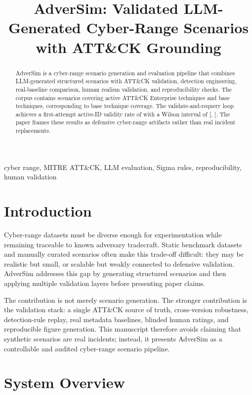 \documentclass[conference]{IEEEtran}
\title{AdverSim: Validated LLM-Generated Cyber-Range Scenarios with ATT\&CK Grounding}
\author{
\IEEEauthorblockN{Anonymous Authors}
\IEEEauthorblockA{Manuscript draft scaffold for macro-wired presentation}
}
\begin{document}
\maketitle

\begin{abstract}
AdverSim is a cyber-range scenario generation and evaluation pipeline that
combines LLM-generated structured scenarios with ATT\&CK validation, detection
engineering, real-baseline comparison, human realism validation, and
reproducibility checks. The corpus contains \ScenarioCount{} scenarios covering
\UniqueActiveV{} active ATT\&CK Enterprise techniques and
\UniqueBaseTechniques{} base techniques, corresponding to \BaseCoverage{} base
technique coverage. The validate-and-requery loop achieves a first-attempt
active-ID validity rate of \FirstAttemptRate{} with a Wilson interval of
[\FirstAttemptCIlo{}, \FirstAttemptCIhi{}]. The paper frames these results as
defensive cyber-range artifacts rather than real incident replacements.
\end{abstract}

\begin{IEEEkeywords}
cyber range, MITRE ATT\&CK, LLM evaluation, Sigma rules, reproducibility,
human validation
\end{IEEEkeywords}

\section{Introduction}

Cyber-range datasets must be diverse enough for experimentation while remaining
traceable to known adversary tradecraft. Static benchmark datasets and manually
curated scenarios often make this trade-off difficult: they may be realistic
but small, or scalable but weakly connected to defensive validation. AdverSim
addresses this gap by generating structured scenarios and then applying
multiple validation layers before presenting paper claims.

The contribution is not merely scenario generation. The stronger contribution
is the validation stack: a single ATT\&CK source of truth, cross-version
robustness, detection-rule replay, real metadata baselines, blinded human
ratings, and reproducible figure generation. This manuscript therefore avoids
claiming that synthetic scenarios are real incidents; instead, it presents
AdverSim as a controllable and audited cyber-range scenario pipeline.

\section{System Overview}
\end{document}
